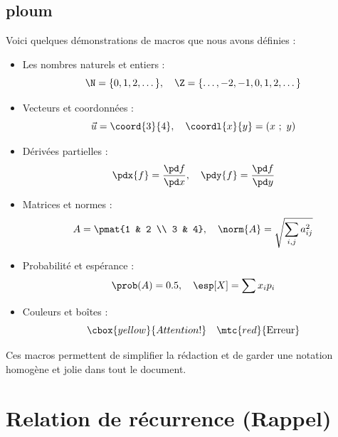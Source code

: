 \documentclass[10pt,a4paper]{article}
\def\bi{\begin{itemize}}\def\ei{\end{itemize}}
\begin{document}
\subsection{ploum}
\begin{meth}
	Voici quelques démonstrations de macros que nous avons définies :

	\bi
	\item Les nombres naturels et entiers :
	$$
		\N = \{0,1,2,\dots\}, \quad \Z = \{\dots,-2,-1,0,1,2,\dots\}
	$$

	\item Vecteurs et coordonnées :
	$$
		\vec{u} = \coord{3}{4}, \quad
		\coordl{x}{y} = (x~;~y)
	$$

	\item Dérivées partielles :
	$$
		\pdx{f} = \frac{\pd f}{\pd x}, \quad
		\pdy{f} = \frac{\pd f}{\pd y}
	$$

	\item Matrices et normes :
	$$
		A = \pmat{1 & 2 \\ 3 & 4}, \quad
		\norm{A} = \sqrt{\sum_{i,j} a_{ij}^2}
	$$

	\item Probabilité et espérance :
	$$
		\prob(A) = 0.5, \quad \esp[X] = \sum x_i p_i
	$$

	\item Couleurs et boîtes :
	$$
		\cbox{yellow}{Attention !} \quad
		\mtc{red}{\text{Erreur}}
	$$
	\ei

	Ces macros permettent de simplifier la rédaction et de garder une notation homogène et jolie dans tout le document.
\end{meth}


\section{Relation de récurrence (Rappel)}
\end{document}
